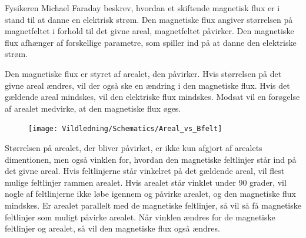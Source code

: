 Fysikeren Michael Faraday beskrev, hvordan et skiftende magnetisk flux er i stand til at danne en elektrisk strøm. Den magnetiske flux angiver størrelsen på magnetfeltet i forhold til det givne areal, magnetfeltet påvirker. Den magnetiske flux afhænger af forskellige parametre, som spiller ind på at danne den elektriske strøm.

Den magnetiske flux er styret af arealet, den påvirker. Hvis størrelsen på det givne areal ændres, vil der også ske en ændring i den magnetiske flux. Hvis det gældende areal mindskes, vil den elektriske flux mindskes. Modsat vil en forøgelse af arealet medvirke, at den magnetiske flux øges.

\begin{figure}[H]
\texttt{[image: Vildledning/Schematics/Areal\_vs\_Bfelt]}
\end{figure}

Størrelsen på arealet, der bliver påvirket, er ikke kun afgjort af arealets dimentionen, men også vinklen for, hvordan den magnetiske feltlinjer står ind på det givne areal. Hvis feltlinjerne står vinkelret på det gældende areal, vil flest mulige feltlinjer rammen arealet. Hvis arealet står vinklet under 90 grader, vil nogle af feltlinjerne ikke løbe igennem og påvirke arealet, og den magnetiske flux mindskes. Er arealet parallelt med de magnetiske feltlinjer, så vil så få magnetiske feltlinjer som muligt påvirke arealet. Når vinklen ændres for de magnetiske feltlinjer og arealet, så vil den magnetiske flux også ændres.

